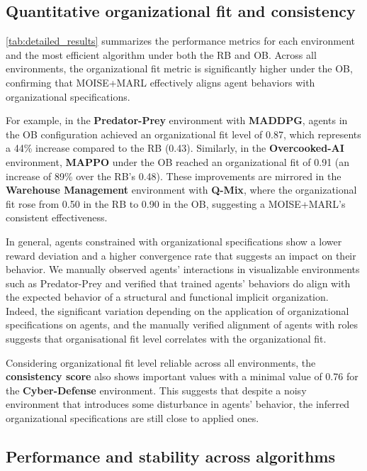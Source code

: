 \documentclass[sigconf]{aamas}
\begin{document}
\subsection{Quantitative organizational fit and consistency}

\autoref{tab:detailed_results} summarizes the performance metrics for each environment and the most efficient algorithm under both the RB and OB. Across all environments, the organizational fit metric is significantly higher under the OB, confirming that MOISE+MARL effectively aligns agent behaviors with organizational specifications.

For example, in the \textbf{Predator-Prey} environment with \textbf{MADDPG}, agents in the OB configuration achieved an organizational fit level of 0.87, which represents a 44\% increase compared to the RB (0.43). Similarly, in the \textbf{Overcooked-AI} environment, \textbf{MAPPO} under the OB reached an organizational fit of 0.91 (an increase of 89\% over the RB's 0.48). These improvements are mirrored in the \textbf{Warehouse Management} environment with \textbf{Q-Mix}, where the organizational fit rose from 0.50 in the RB to 0.90 in the OB, suggesting a MOISE+MARL's consistent effectiveness.

In general, agents constrained with organizational specifications show a lower reward deviation and a higher convergence rate that suggests an impact on their behavior. We manually observed agents' interactions in visualizable environments such as Predator-Prey and verified that trained agents' behaviors do align with the expected behavior of a structural and functional implicit organization.
%
Indeed, the significant variation depending on the application of organizational specifications on agents, and the manually verified alignment of agents with roles suggests that organisational fit level correlates with the organizational fit.

Considering organizational fit level reliable across all environments, the \textbf{consistency score} also shows important values with a minimal value of 0.76 for the \textbf{Cyber-Defense} environment. This suggests that despite a noisy environment that introduces some disturbance in agents' behavior, the inferred organizational specifications are still close to applied ones.

\subsection{Performance and stability across algorithms}
\end{document}
